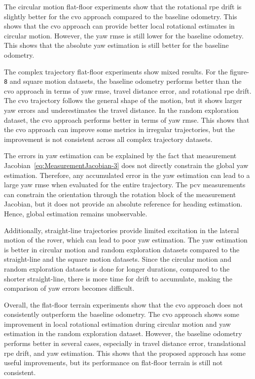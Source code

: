 \documentclass[report.tex]{subfiles}
\begin{document}
    The circular motion flat-floor experiments show that the rotational \gls{rpe} drift is slightly better for the \gls{cvo} approach compared to the baseline odometry. This shows that the \gls{cvo} approach can provide better local rotational estimates in circular motion. However, the yaw \gls{rmse} is still lower for the baseline odometry. This shows that the absolute yaw estimation is still better for the baseline odometry.

    The complex trajectory flat-floor experiments show mixed results. For the figure-\texttt{8} and square motion datasets, the baseline odometry performs better than the \gls{cvo} approach in terms of yaw \gls{rmse}, travel distance error, and rotational \gls{rpe} drift. The \gls{cvo} trajectory follows the general shape of the motion, but it shows larger yaw errors and underestimates the travel distance. In the random exploration dataset, the \gls{cvo} approach performs better in terms of yaw \gls{rmse}. This shows that the \gls{cvo} approach can improve some metrics in irregular trajectories, but the improvement is not consistent across all complex trajectory datasets.

    The errors in yaw estimation can be explained by the fact that measurement Jacobian~\ref{eq:MeasurementJacobian-3} does not directly constrain the global yaw estimation. Therefore, any accumulated error in the yaw estimation can lead to a large yaw \gls{rmse} when evaluated for the entire trajectory. The \gls{pcv} measurements can constrain the orientation through the rotation block of the measurement Jacobian, but it does not provide an absolute reference for heading estimation. Hence, global estimation remains unobservable.
    
    Additionally, straight-line trajectories provide limited excitation in the lateral motion of the rover, which can lead to poor yaw estimation. The yaw estimation is better in circular motion and random exploration datasets compared to the straight-line and the square motion datasets. Since the circular motion and random exploration datasets is done for longer durations, compared to the shorter straight-line, there is more time for drift to accumulate, making the comparison of yaw errors becomes difficult.  

    Overall, the flat-floor terrain experiments show that the \gls{cvo} approach does not consistently outperform the baseline odometry. The \gls{cvo} approach shows some improvement in local rotational estimation during circular motion and yaw estimation in the random exploration dataset. However, the baseline odometry performs better in several cases, especially in travel distance error, translational \gls{rpe} drift, and yaw estimation. This shows that the proposed approach has some useful improvements, but its performance on flat-floor terrain is still not consistent.
    
\end{document}
